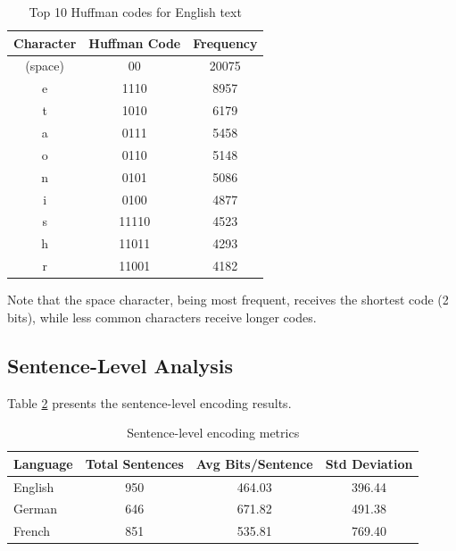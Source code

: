\documentclass[11pt]{article}
\begin{document}
\begin{table}[h]
\centering
\begin{tabular}{ccc}
\hline
\textbf{Character} & \textbf{Huffman Code} & \textbf{Frequency} \\
\hline
(space)            & 00                    & 20075              \\
e                  & 1110                  & 8957               \\
t                  & 1010                  & 6179               \\
a                  & 0111                  & 5458               \\
o                  & 0110                  & 5148               \\
n                  & 0101                  & 5086               \\
i                  & 0100                  & 4877               \\
s                  & 11110                 & 4523               \\
h                  & 11011                 & 4293               \\
r                  & 11001                 & 4182               \\
\hline
\end{tabular}
\caption{Top 10 Huffman codes for English text}
\label{tab:huffman}
\end{table}

Note that the space character, being most frequent, receives the shortest code (2 bits), while less common characters receive longer codes.

\subsection{Sentence-Level Analysis}
Table \ref{tab:sentence} presents the sentence-level encoding results.

\begin{table}[h]
\centering
\begin{tabular}{lccc}
\hline
\textbf{Language} & \textbf{Total Sentences} & \textbf{Avg Bits/Sentence} & \textbf{Std Deviation} \\
\hline
English           & 950                      & 464.03                     & 396.44                 \\
German            & 646                      & 671.82                     & 491.38                 \\
French            & 851                      & 535.81                     & 769.40                 \\
\hline
\end{tabular}
\caption{Sentence-level encoding metrics}
\label{tab:sentence}
\end{table}
\end{document}
